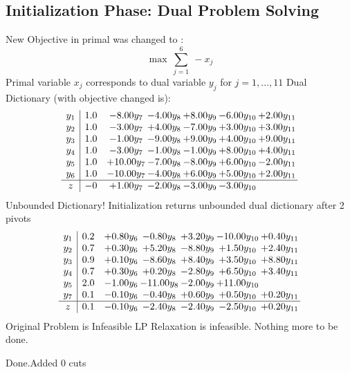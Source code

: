 \documentclass[8pt]{article}
\begin{document}
\subsection{Initialization Phase: Dual Problem Solving}
New Objective in primal was changed to : \[ \max\ \sum_{j=1}^{6}\ - x_j \] 
Primal variable $x_j$ corresponds to dual variable $y_j$ for $j = 1,\ldots,11$
Dual Dictionary (with objective changed is): 
\[\begin{array}{c| c c@{\hskip 2pt} c@{\hskip 2pt} c@{\hskip 2pt} c@{\hskip 2pt} c@{\hskip 2pt} }
 y_{1}   &  1.0 & -8.00 y_{7} & -4.00 y_{8} & +  8.00 y_{9} & -6.00 y_{10} & +  2.00 y_{11}\\
 y_{2}   &  1.0 & -3.00 y_{7} & +  4.00 y_{8} & -7.00 y_{9} & +  3.00 y_{10} & +  3.00 y_{11}\\
 y_{3}   &  1.0 & -1.00 y_{7} & -9.00 y_{8} & +  9.00 y_{9} & +  4.00 y_{10} & +  9.00 y_{11}\\
 y_{4}   &  1.0 & -3.00 y_{7} & -1.00 y_{8} & -1.00 y_{9} & +  8.00 y_{10} & +  4.00 y_{11}\\
 y_{5}   &  1.0 & + 10.00 y_{7} & -7.00 y_{8} & -8.00 y_{9} & +  6.00 y_{10} & -2.00 y_{11}\\
 y_{6}   &  1.0 & -10.00 y_{7} & -4.00 y_{8} & +  6.00 y_{9} & +  5.00 y_{10} & +  2.00 y_{11}\\
\hline
z    &  -0 & +  1.00 y_{7} & -2.00 y_{8} & -3.00 y_{9} & -3.00 y_{10} &   \\
\end{array}\]
Unbounded Dictionary!
Initialization returns unbounded dual dictionary after 2 pivots
\[\begin{array}{c| c c@{\hskip 2pt} c@{\hskip 2pt} c@{\hskip 2pt} c@{\hskip 2pt} c@{\hskip 2pt} }
 y_{1}   &  0.2 & +  0.80 y_{6} & -0.80 y_{8} & +  3.20 y_{9} & -10.00 y_{10} & +  0.40 y_{11}\\
 y_{2}   &  0.7 & +  0.30 y_{6} & +  5.20 y_{8} & -8.80 y_{9} & +  1.50 y_{10} & +  2.40 y_{11}\\
 y_{3}   &  0.9 & +  0.10 y_{6} & -8.60 y_{8} & +  8.40 y_{9} & +  3.50 y_{10} & +  8.80 y_{11}\\
 y_{4}   &  0.7 & +  0.30 y_{6} & +  0.20 y_{8} & -2.80 y_{9} & +  6.50 y_{10} & +  3.40 y_{11}\\
 y_{5}   &  2.0 & -1.00 y_{6} & -11.00 y_{8} & -2.00 y_{9} & + 11.00 y_{10} &   \\
 y_{7}   &  0.1 & -0.10 y_{6} & -0.40 y_{8} & +  0.60 y_{9} & +  0.50 y_{10} & +  0.20 y_{11}\\
\hline
z    &  0.1 & -0.10 y_{6} & -2.40 y_{8} & -2.40 y_{9} & -2.50 y_{10} & +  0.20 y_{11}\\
\end{array}\]
Original Problem is Infeasible
 LP Relaxation is infeasible. Nothing more to be done. 

Done.Added 0 cuts 
\end{document}
